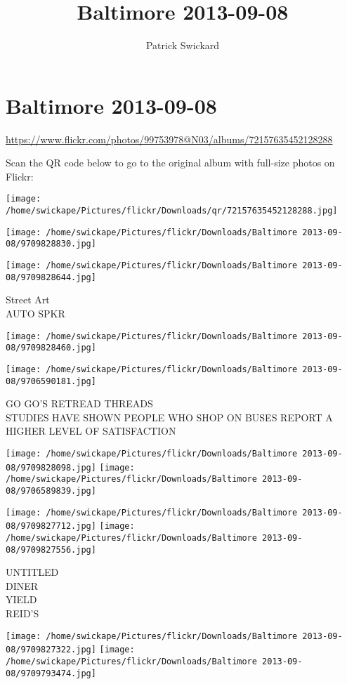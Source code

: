 \documentclass[10pt,letterpaper]{article}
\title{Baltimore 2013-09-08}
\author{Patrick Swickard}
\date{}
\begin{document}
\section*{Baltimore 2013-09-08}

\url{https://www.flickr.com/photos/99753978@N03/albums/72157635452128288}

Scan the QR code below to go to the original album with full-size photos on Flickr:

\texttt{[image: /home/swickape/Pictures/flickr/Downloads/qr/72157635452128288.jpg]}
\pagebreak

\texttt{[image: /home/swickape/Pictures/flickr/Downloads/Baltimore 2013-09-08/9709828830.jpg]}

\vspace{0.25in}
\texttt{[image: /home/swickape/Pictures/flickr/Downloads/Baltimore 2013-09-08/9709828644.jpg]}

Street Art\\
AUTO SPKR
\pagebreak

\texttt{[image: /home/swickape/Pictures/flickr/Downloads/Baltimore 2013-09-08/9709828460.jpg]}

\vspace{0.25in}
\texttt{[image: /home/swickape/Pictures/flickr/Downloads/Baltimore 2013-09-08/9706590181.jpg]}

GO GO'S RETREAD THREADS\\
STUDIES HAVE SHOWN PEOPLE WHO SHOP ON BUSES REPORT A HIGHER LEVEL OF SATISFACTION
\pagebreak

\texttt{[image: /home/swickape/Pictures/flickr/Downloads/Baltimore 2013-09-08/9709828098.jpg]}
\texttt{[image: /home/swickape/Pictures/flickr/Downloads/Baltimore 2013-09-08/9706589839.jpg]}

\texttt{[image: /home/swickape/Pictures/flickr/Downloads/Baltimore 2013-09-08/9709827712.jpg]}
\texttt{[image: /home/swickape/Pictures/flickr/Downloads/Baltimore 2013-09-08/9709827556.jpg]}

UNTITLED\\
DINER\\
YIELD\\
REID'S
\pagebreak

\texttt{[image: /home/swickape/Pictures/flickr/Downloads/Baltimore 2013-09-08/9709827322.jpg]}
\texttt{[image: /home/swickape/Pictures/flickr/Downloads/Baltimore 2013-09-08/9709793474.jpg]}
\end{document}
